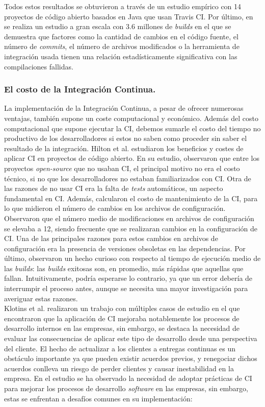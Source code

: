 Todos estos resultados se obtuvieron a través de un estudio empírico con 14 proyectos de código
abierto basados en Java que usan Travis CI. Por último, en \cite{16} se realiza un estudio a gran
escala con 3.6 millones de \textit{builds} en el que se demuestra que factores como la cantidad
de cambios en el código fuente, el número de \textit{commits}, el número de archivos modificados
o la herramienta de integración usada tienen una relación estadísticamente significativa con las
compilaciones fallidas.\\ 

\subsubsection{El costo de la Integración Continua.}
La implementación de la Integración Continua, a pesar de ofrecer numerosas ventajas, también
supone un coste computacional y económico. Además del costo computacional que supone ejecutar
la CI, debemos sumarle el costo del tiempo no productivo de los desarrolladores si estos
no saben como proceder sin saber el resultado de la integración. Hilton et al. \cite{10} estudiaron
los beneficios y costes de aplicar CI en proyectos de código abierto. En su estudio,
observaron que entre los proyectos \textit{open-source} que no usaban CI, el principal
motivo no era el costo técnico, si no que los desarrolladores no estaban familiarizados con
CI. Otra de las razones de no usar CI era la falta de \textit{tests} automáticos,
un aspecto fundamental en CI. Además, calcularon el costo de mantenimiento de la
CI, para lo que midieron el número de cambios en los archivos de configuración. Observaron
que el número medio de modificaciones en archivos de configuración se elevaba a 12, siendo
frecuente que se realizaran cambios en la configuración de CI. Una de las principales
razones para estos cambios en archivos de configuración era la presencia de versiones obsoletas
en las dependencias. Por último, observaron un hecho curioso con respecto al tiempo de ejecución
medio de las \textit{builds}: las \textit{builds} exitosas son, en promedio, más rápidas que
aquellas que fallan. Intuitivamente, podría esperarse lo contrario, ya que un error debería de
interrumpir el proceso antes, aunque se necesita una mayor investigación para averiguar estas
razones.\\

Klotins et al. \cite{18} realizaron un trabajo con múltiples casos de estudio en el que
encontraron que la aplicación de CI mejoraba notablemente los procesos de desarrollo
internos en las empresas, sin embargo, se destaca la necesidad de evaluar las consecuencias de
aplicar este tipo de desarrollo desde una perspectiva del cliente. El hecho de actualizar a los
clientes a entregas continuas es un obstáculo importante ya que pueden existir acuerdos previos,
y renegociar dichos acuerdos conlleva un riesgo de perder clientes y causar inestabilidad en la
empresa. En el estudio se ha observado la necesidad de adoptar prácticas de CI para
mejorar los procesos de desarrollo \textit{software} en las empresas, sin embargo, estas se
enfrentan a desafíos comunes en su implementación:

